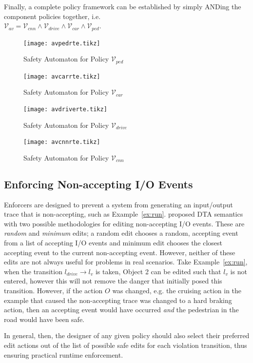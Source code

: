 Finally, a complete policy framework can be established by simply ANDing the component policies together, i.e. \\ $\mathcal{V}_{av} = \mathcal{V}_{cnn} \wedge \mathcal{V}_{drive} \wedge \mathcal{V}_{car} \wedge \mathcal{V}_{ped}$.

\begin{figure}[H]
	\centering
	\texttt{[image: avpedrte.tikz]}
	\caption{Safety Automaton for Policy $\mathcal{V}_{ped}$\label{fig:avpedrte}}
\end{figure}
\begin{figure}[H]
	\centering
	\texttt{[image: avcarrte.tikz]}
	\caption{Safety Automaton for Policy $\mathcal{V}_{car}$\label{fig:avcarrte}}
\end{figure}
\begin{figure}[H]
	\centering
	\texttt{[image: avdriverte.tikz]}
	\caption{Safety Automaton for Policy $\mathcal{V}_{drive}$\label{fig:avdriverte}}
\end{figure}
\begin{figure}[H]
	\centering
	\texttt{[image: avcnnrte.tikz]}
	\caption{Safety Automaton for Policy $\mathcal{V}_{cnn}$\label{fig:avcnnrte}}
\end{figure}


\subsection{Enforcing Non-accepting I/O Events}
Enforcers are designed to prevent a system from generating an input/output trace that is non-accepting, such as Example~\ref{ex:run}.
\cite{recps} proposed \ac{DTA} semantics with two possible methodologies for editing non-accepting I/O events.
These are \textit{random} and \textit{minimum} edits; a random edit chooses a random, accepting event from a list of accepting I/O events and minimum edit chooses the closest accepting event to the current non-accepting event.
However, neither of these edits are not always useful for problems in real scenarios.
Take Example~\ref{ex:run}, when the transition $l_{drive} \rightarrow l_v$ is taken, Object 2 can be edited such that $l_v$ is not entered, however this will not remove the danger that initially posed this transition.
However, if the action ${O}$ was changed, e.g. the cruising action in the example that caused the non-accepting trace was changed to a hard braking action, then an accepting event would have occurred \textit{and} the pedestrian in the road would have been safe.

In general, then, the designer of any given policy should also select their preferred edit actions out of the list of possible safe edits for each violation transition, thus ensuring practical runtime enforcement.

